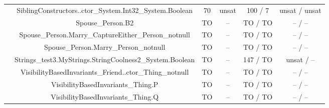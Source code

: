 \begin{table}[htbp]
\begin{minipage}{0.60\textwidth}
{\begin{tabular}[c]{c c!{\vrule width 1.5pt}c|c!{\vrule width 1.5pt}c|c|}
   		& SiblingConstructors..ctor\_System.Int32\_System.Boolean    & 70   & unsat   & 100 / 7        & unsat / unsat     \\
   		& Spouse\_Person.B2    					     & TO   & --      & TO  / TO       & --    / --        \\
   		& Spouse\_Person.Marry\_CaptureEither\_Person\_notnull       & TO   & --      & TO  / TO       & --    / --        \\
   		& Spouse\_Person.Marry\_Person\_notnull    		     & TO   & --      & TO  / TO       & --    / --        \\
   		& Strings\_test3.MyStrings.StringCoolness2\_System.Boolean   & TO   & --      & 147 / TO       & unsat / --        \\
   		& VisibilityBasedInvariants\_Friend..ctor\_Thing\_notnull    & TO   & --      & TO  / TO       & --    / --        \\
   		& VisibilityBasedInvariants\_Thing.P    		     & TO   & --      & TO  / TO       & --    / --        \\
   		& VisibilityBasedInvariants\_Thing.Q    		     & TO   & --      & TO  / TO       & --    / --        \\

\end{tabular}}
\end{minipage}
\end{table}
